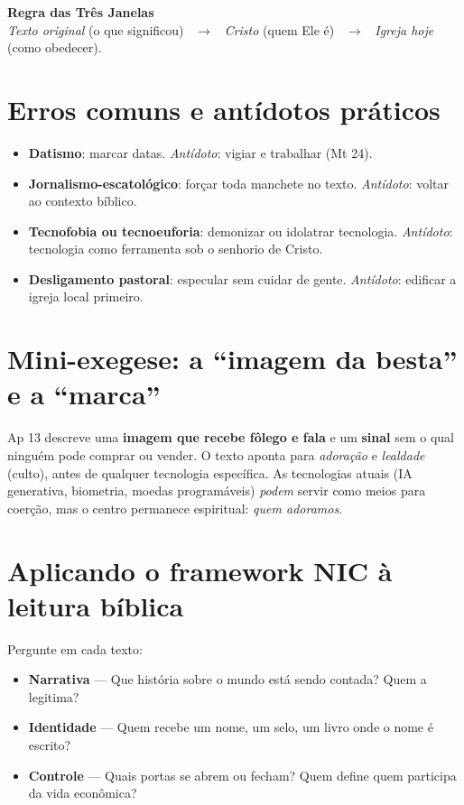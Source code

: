 \begin{nicbox}
\textbf{Regra das Três Janelas}\\
\textit{Texto original} (o que significou) \ $\rightarrow$ \ \textit{Cristo} (quem Ele é) \ $\rightarrow$ \ \textit{Igreja hoje} (como obedecer).
\end{nicbox}

\section{Erros comuns e antídotos práticos}
\begin{checklist}
\begin{itemize}[leftmargin=*,noitemsep]
  \item \textbf{Datismo}: marcar datas. \emph{Antídoto}: vigiar e trabalhar (Mt 24).
  \item \textbf{Jornalismo-escatológico}: forçar toda manchete no texto. \emph{Antídoto}: voltar ao contexto bíblico.
  \item \textbf{Tecnofobia ou tecnoeuforia}: demonizar ou idolatrar tecnologia. \emph{Antídoto}: tecnologia como ferramenta sob o senhorio de Cristo.
  \item \textbf{Desligamento pastoral}: especular sem cuidar de gente. \emph{Antídoto}: edificar a igreja local primeiro.
\end{itemize}
\end{checklist}

\section{Mini-exegese: a ``imagem da besta'' e a ``marca''}
Ap 13 descreve uma \textbf{imagem que recebe fôlego e fala} e um \textbf{sinal} sem o qual ninguém pode comprar ou vender. O texto aponta para \textit{adoração} e \textit{lealdade} (culto), antes de qualquer tecnologia específica. As tecnologias atuais (IA generativa, biometria, moedas programáveis) \textit{podem} servir como meios para coerção, mas o centro permanece espiritual: \emph{quem adoramos}.

\section{Aplicando o framework NIC à leitura bíblica}
Pergunte em cada texto:
\begin{itemize}[leftmargin=*,noitemsep]
  \item \textbf{Narrativa} --- Que história sobre o mundo está sendo contada? Quem a legitima?
  \item \textbf{Identidade} --- Quem recebe um nome, um selo, um livro onde o nome é escrito?
  \item \textbf{Controle} --- Quais portas se abrem ou fecham? Quem define quem participa da vida econômica?
\end{itemize}

